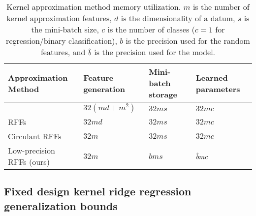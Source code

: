 \begin{table}
	\caption{Kernel approximation method memory utilization. $m$ is the number of kernel approximation features, $d$ is the dimensionality of a datum, $s$ is the mini-batch size, $c$ is the number of classes ($c=1$ for regression/binary classification), $b$ is the precision used for the random features, and $\hat{b}$ is the precision used for the model.}
	\label{table:mem-usage}
	\centering
	\begin{tabular}{llll}
		\toprule
		Approximation Method & Feature generation & Mini-batch storage & Learned parameters \\
		\midrule
		\Nystrom \citep{nystrom} & $32(md + m^2)$ & $32ms$ & $32mc$ \\
		RFFs \citep{rahimi07random} &  $32md$ & $32ms$ & $32mc$ \\
		Circulant RFFs \citep{yu15} & $32m$ & $32ms$ & $32mc$ \\
		Low-precision RFFs (ours)& $32m$ & $bms$ & $\hat{b} mc$ \\
		\bottomrule
	\end{tabular}
\end{table}

\subsection{Fixed design kernel ridge regression generalization bounds}
\label{sec:genbound}

